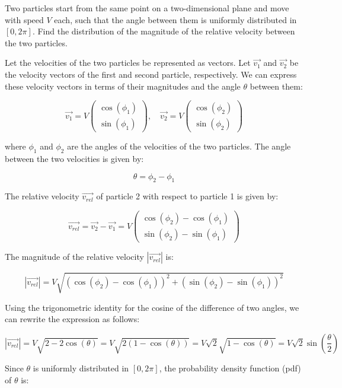 \begin{exercise}
Two particles start from the same point on a two-dimensional plane and move with speed \( V \) each, such that the angle between them is uniformly distributed in \([0, 2\pi]\). Find the distribution of the magnitude of the relative velocity between the two particles.
\end{exercise}

\begin{solution}
Let the velocities of the two particles be represented as vectors. Let \(\vec{v_1}\) and \(\vec{v_2}\) be the velocity vectors of the first and second particle, respectively. We can express these velocity vectors in terms of their magnitudes and the angle \(\theta\) between them:

\[
\vec{v_1} = V \begin{pmatrix} \cos(\phi_1) \\ \sin(\phi_1) \end{pmatrix}, \quad \vec{v_2} = V \begin{pmatrix} \cos(\phi_2) \\ \sin(\phi_2) \end{pmatrix}
\]

where \(\phi_1\) and \(\phi_2\) are the angles of the velocities of the two particles. The angle between the two velocities is given by:

\[
\theta = \phi_2 - \phi_1
\]

The relative velocity \(\vec{v_{rel}}\) of particle 2 with respect to particle 1 is given by:

\[
\vec{v_{rel}} = \vec{v_2} - \vec{v_1} = V \begin{pmatrix} \cos(\phi_2) - \cos(\phi_1) \\ \sin(\phi_2) - \sin(\phi_1) \end{pmatrix}
\]

The magnitude of the relative velocity \( |\vec{v_{rel}}| \) is:

\[
|\vec{v_{rel}}| = V \sqrt{(\cos(\phi_2) - \cos(\phi_1))^2 + (\sin(\phi_2) - \sin(\phi_1))^2}
\]

Using the trigonometric identity for the cosine of the difference of two angles, we can rewrite the expression as follows:

\[
|\vec{v_{rel}}| = V \sqrt{2 - 2\cos(\theta)} = V \sqrt{2(1 - \cos(\theta))} = V \sqrt{2} \sqrt{1 - \cos(\theta)} = V \sqrt{2} \sin\left(\frac{\theta}{2}\right)
\]

Since \(\theta\) is uniformly distributed in \([0, 2\pi]\), the probability density function (pdf) of \(\theta\) is:


\end{solution}
